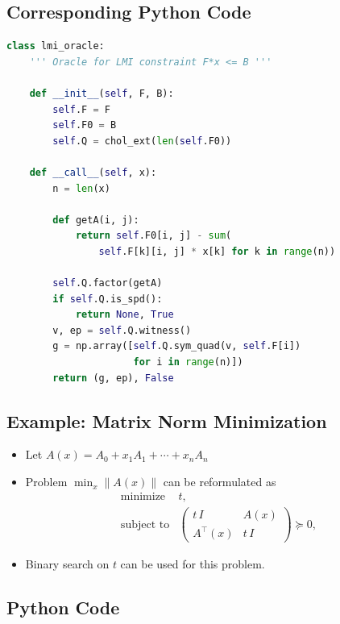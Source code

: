 \documentclass[]{article}
\providecommand{\tightlist}{%
  \setlength{\itemsep}{0pt}\setlength{\parskip}{0pt}}
\begin{document}
\hypertarget{corresponding-python-code-2}{%
\subsection{Corresponding Python
Code}\label{corresponding-python-code-2}}

\scriptsize

\begin{lstlisting}[language=Python]
class lmi_oracle:
    ''' Oracle for LMI constraint F*x <= B '''

    def __init__(self, F, B):
        self.F = F
        self.F0 = B
        self.Q = chol_ext(len(self.F0))

    def __call__(self, x):
        n = len(x)

        def getA(i, j):
            return self.F0[i, j] - sum(
                self.F[k][i, j] * x[k] for k in range(n))

        self.Q.factor(getA)
        if self.Q.is_spd():
            return None, True
        v, ep = self.Q.witness()
        g = np.array([self.Q.sym_quad(v, self.F[i])
                      for i in range(n)])
        return (g, ep), False
\end{lstlisting}

\hypertarget{example-matrix-norm-minimization}{%
\subsection{Example: Matrix Norm
Minimization}\label{example-matrix-norm-minimization}}

\begin{itemize}
\tightlist
\item
  Let \(A(x) = A_0 + x_1 A_1 + \cdots + x_n A_n\)
\item
  Problem \(\min_x \| A(x) \|\) can be reformulated as
  \[\begin{array}{ll}
       \text{minimize}      & t, \\
       \text{subject to}    & \left(
   \begin{array}{cc}
    t\,I   & A(x) \\
    A^\top(x) & t\,I
   \end{array} \right) \succeq 0,
   \end{array}\]
\item
  Binary search on \(t\) can be used for this problem.
\end{itemize}

\hypertarget{python-code-1}{%
\subsection{Python Code}\label{python-code-1}}
\end{document}
